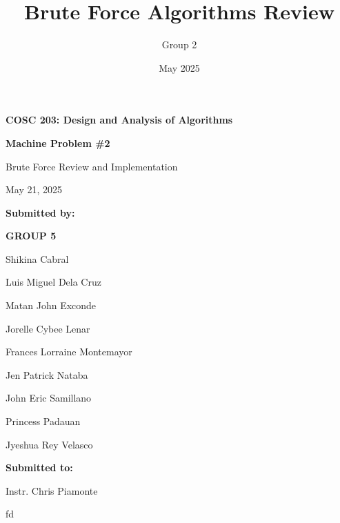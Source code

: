 \documentclass[a4paper, 11pt]{article}
\title{\textbf{Brute Force Algorithms Review}}
\author{Group 2}
\date{May 2025}
\begin{document}
\begin{titlepage}
    \centering
    \vspace*{2cm}

    {\Large \textbf{COSC 203: Design and Analysis of Algorithms} \par}
    \vspace{1cm}

    {\LARGE \textbf{Machine Problem \#2} \par}
    \vspace{0.5cm}
    
    {\Large Brute Force Review and Implementation \par}
    \vspace{2cm}

    {\large May 21, 2025 \par}
    \vspace{2cm}

    {\large \textbf{Submitted by:} \par}
    {\large \textbf{GROUP 5} \par}
    {\large Shikina Cabral \par}    
    {\large Luis Miguel Dela Cruz \par}
    {\large Matan John Exconde \par}
    {\large Jorelle Cybee Lenar \par}
    {\large Frances Lorraine Montemayor \par}
    {\large Jen Patrick Nataba \par}
    {\large John Eric Samillano \par}
    {\large Princess Padauan \par}
    {\large Jyeshua Rey Velasco \par}
    \vspace{1cm}

    {\large \textbf{Submitted to:} \par}
    {\large Instr. Chris Piamonte \par}

\end{titlepage}

\tableofcontents

fd
\end{document}
